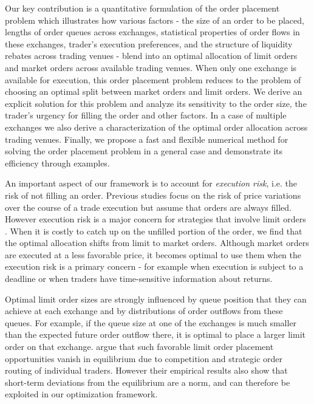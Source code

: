 \documentclass[opre,nonblindrev]{informs3}
\begin{document}
Our key contribution is a quantitative formulation of the order placement problem which illustrates how various factors - the size of an order to be placed, lengths of order queues across exchanges, statistical properties of order flows in these exchanges, trader's execution preferences, and the structure of liquidity rebates across trading venues -  blend into an optimal allocation of limit orders and market orders across available trading venues. When only one exchange is available for execution, this order placement problem reduces to the problem of choosing an optimal split between market orders and limit orders. We derive an explicit solution for this problem and analyze its sensitivity to the order size, the trader's urgency for filling the order and other factors. In a case of multiple exchanges we also derive a characterization of the optimal order allocation across trading venues. Finally, we propose a fast and flexible numerical method  for solving the order placement problem in a general case and demonstrate its efficiency through examples.

An important aspect of our framework is to account for   {\it execution  risk}, i.e. the risk of not filling an order. Previous studies focus on the risk of price variations over the course of a trade execution \cite{almgren00,huberman2005} but assume that orders are always filled. However execution risk is a major concern for strategies that involve limit orders \citep{Harris1996}. When it is costly to catch up on the unfilled portion of the order, we find that the optimal allocation shifts from limit to market orders. Although market orders are executed at a less favorable price,  it becomes optimal to use them  when the  execution risk is a primary concern - for example when execution is subject to a deadline or when traders have time-sensitive information about returns.

Optimal limit order sizes are strongly influenced by queue position that they can achieve at each exchange and by distributions of order outflows from these queues. For example, if the queue size at one of the exchanges is much smaller than the expected future order outflow there, it is optimal to place a larger limit order on that exchange.  \cite{Moallemi2011} argue that such favorable limit order placement opportunities vanish in equilibrium due to competition and strategic order routing of individual traders. However their empirical results also show that short-term deviations from the equilibrium are a norm, and can therefore be exploited in our optimization framework.
\end{document}
